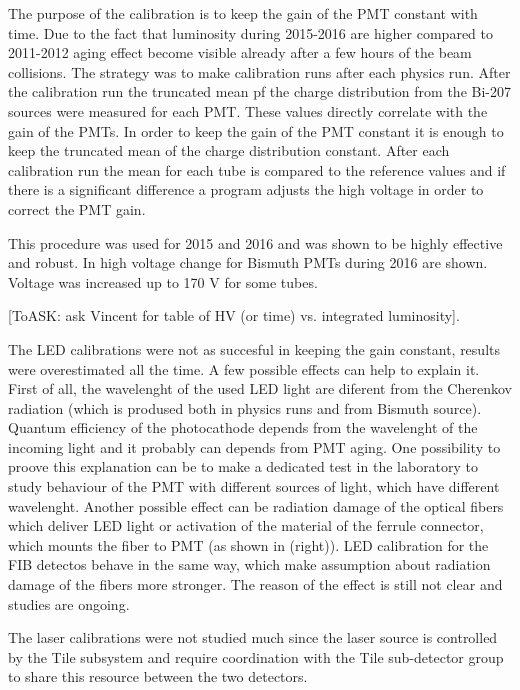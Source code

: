 The purpose of the calibration is to keep the gain of the PMT constant with time.
Due to the fact that luminosity during 2015-2016 are higher compared to 2011-2012
aging effect become visible already after a few hours of the beam collisions.
The strategy was to make calibration runs after each physics run.
After the calibration run the truncated mean pf the charge distribution from the Bi-207 sources were measured for each PMT.
These values directly correlate with the gain of the PMTs. 
In order to keep the gain of the PMT constant it is enough to keep the truncated mean of the charge distribution constant.
After each calibration run the mean for each tube is compared to the reference values and if there is a significant difference a program 
adjusts the high voltage in order to correct the PMT gain.

This procedure was used for 2015 and 2016 and was shown to be highly effective and robust.
In  high voltage change for Bismuth PMTs during 2016 are shown. 
Voltage was increased up to 170 V for some tubes.

[ToASK: ask Vincent for table of HV (or time) vs. integrated luminosity].

The LED calibrations were not as succesful in keeping the gain constant, results were overestimated all the time.
A few possible effects can help to explain it. First of all, the wavelenght of the used LED light are diferent from the Cherenkov radiation 
(which is prodused both in physics runs and from Bismuth source).
Quantum efficiency of the photocathode depends from the wavelenght of the incoming light and it probably can depends from PMT aging.
One possibility to proove this explanation can be to make a dedicated test in the laboratory to study behaviour of the PMT with different sources of light, which have different wavelenght.
Another possible effect can be radiation damage of the optical fibers which deliver LED light or activation of the material of the ferrule connector, which mounts the fiber to PMT 
(as shown in  (right)). LED calibration for the FIB detectos behave in the same way, which make assumption about radiation damage of the fibers more stronger.
The reason of the effect is still not clear and studies are ongoing.

The laser calibrations were not studied much since the laser source is controlled by the Tile subsystem and require 
coordination with the Tile sub-detector group to share this resource between the two detectors.


